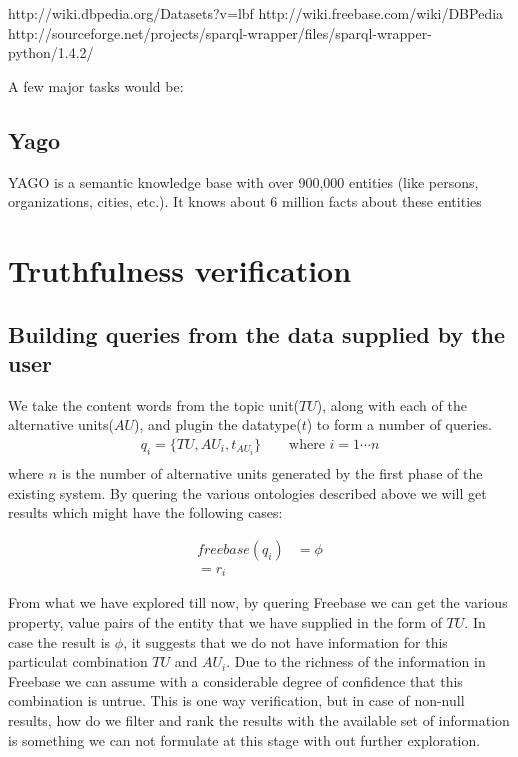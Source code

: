 \documentclass[11pt]{article}
\begin{document}
http://wiki.dbpedia.org/Datasets?v=lbf
http://wiki.freebase.com/wiki/DBPedia
http://sourceforge.net/projects/sparql-wrapper/files/sparql-wrapper-python/1.4.2/ 


A few major tasks would be:

\subsection{Yago}
YAGO is a semantic knowledge base with over 900,000 entities (like persons,
organizations, cities, etc.). It knows about 6 million facts about these entities







\section{Truthfulness verification }
\subsection {Building queries from the data supplied by the user}

We take the content words from the topic unit($TU$), along with each of the
alternative units($AU$), and plugin the datatype($t$) to form a number of
queries.
\begin{align*}
q_{i} = \{{TU, AU_{i}, t_{AU_{i}}} \} \qquad \mbox {where $i = 1 \cdots n$} \\
\end{align*}
where $n$ is the number of alternative units generated by the first phase of
the existing system. By quering the various ontologies described above we will
get results which might have the following cases:

\begin{align*}
   freebase(q_{i}) &= \phi \\
    = r_{i}
\end{align*}

From what we have explored till now, by quering Freebase we can get the
various property, value pairs of the entity that we have supplied in the form
of $TU$. In case the result is $\phi$, it suggests that we do not have
information for this particulat combination $TU$ and $AU_{i}$. Due to the
richness of the information in Freebase we can assume with a considerable degree of confidence
that this combination is untrue. This is one way verification, but in case of
non-null results, how do we filter and rank the results with the available set
of information is something we can not formulate at this stage with out further
exploration.
\end{document}
